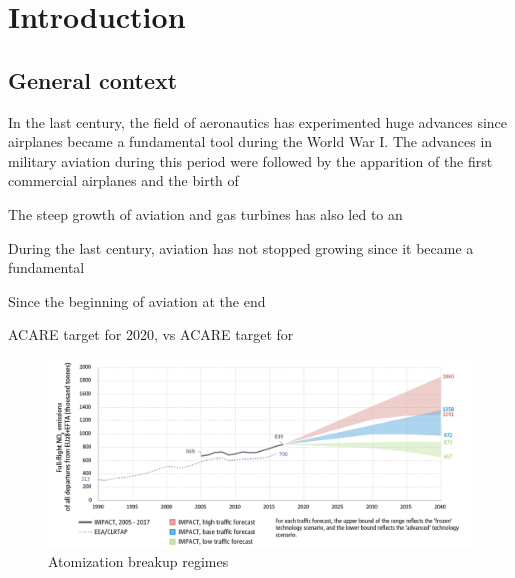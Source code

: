 \chapter{Introduction}
    

\section{General context}

In the last century, the field of aeronautics has experimented huge advances since airplanes became a fundamental tool during the World War I. The advances in military aviation during this period were followed by the apparition of the first commercial airplanes and the birth of  

The steep growth of aviation and gas turbines has also led to an 

During the last century, aviation has not stopped growing since it became a fundamental 

Since the beginning of aviation at the end


ACARE target for 2020, vs ACARE target for 


\begin{figure}[h!]
	\centering
	\includegraphics[scale=0.5]{./part0_intro/NOx_emissions_forecast_report2019}
	\caption{Atomization breakup regimes }
	\label{fig:atomization_regimes_herrmann}
\end{figure}



